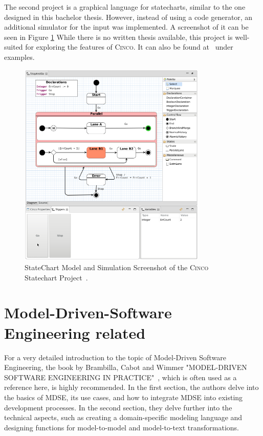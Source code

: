 The second project is a graphical language for statecharts, similar to the one designed in this bachelor thesis. However, instead of using a code generator, an additional simulator for the input was implemented. A screenshot of it can be seen in Figure \ref{fig:CINCO_Statechart_Example} While there is no written thesis available, this project is well-suited for exploring the features of \textsc{Cinco}. It can also be found at~\cite{.06.05.2022} under examples.
\begin{figure}[h!]
\centering
\includegraphics[width=0.8\textwidth]{bilder/CINCO_Statechart_Example}
\caption{StateChart Model and Simulation Screenshot of the \textsc{Cinco} Statechart Project~\cite{.06.05.2022}.}
\label{fig:CINCO_Statechart_Example}
\end{figure} 
\section{Model-Driven-Software Engineering related}
For a very detailed introduction to the topic of Model-Driven Software Engineering, the book by Brambilla, Cabot and Wimmer "MODEL-DRIVEN SOFTWARE ENGINEERING IN PRACTICE"~\cite{Brambilla.2017}, which is often used as a reference here, is highly recommended. In the first section, the authors delve into the basics of MDSE, its use cases, and how to integrate MDSE into existing development processes. In the second section, they delve further into the technical aspects, such as creating a domain-specific modeling language and designing functions for model-to-model and model-to-text transformations.

